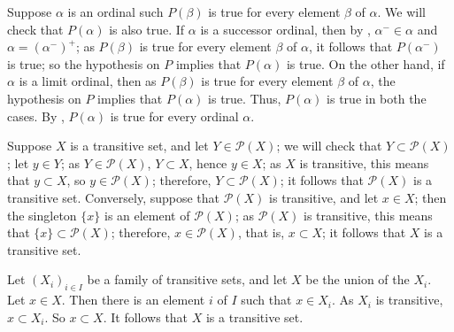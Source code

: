\documentclass{article}
\begin{document}
\begin{solution}[\ref{exe:h8nv276e}]
  \label{sol:ry94ppvi}
  Suppose \(\alpha\) is an ordinal such \(P(\beta)\) is true for every
  element \(\beta\) of \(\alpha\).  We will check that \(P(\alpha)\)
  is also true.  If \(\alpha\) is a successor ordinal, then by
  , \(\alpha^- \in \alpha\) and
  \(\alpha = (\alpha^-)^+\); as \(P(\beta)\) is true for every element
  \(\beta\) of \(\alpha\), it follows that \(P(\alpha^-)\) is true; so
  the hypothesis on \(P\) implies that \(P(\alpha)\) is true.  On the
  other hand, if \(\alpha\) is a limit ordinal, then as \(P(\beta)\)
  is true for every element \(\beta\) of \(\alpha\), the hypothesis on
  \(P\) implies that \(P(\alpha)\) is true.  Thus, \(P(\alpha)\) is
  true in both the cases.  By , \(P(\alpha)\) is
  true for every ordinal \(\alpha\).
\end{solution}

\begin{solution}[\ref{exe:565zdnmj}]
  \label{sol:cs5k5l1y}
  Suppose \(X\) is a transitive set, and let \(Y \in \mathcal{P}(X)\);
  we will check that \(Y \subset \mathcal{P}(X)\); let \(y \in Y\); as
  \(Y \in \mathcal{P}(X)\), \(Y \subset X\), hence \(y \in X\); as
  \(X\) is transitive, this means that \(y \subset X\), so
  \(y \in \mathcal{P}(X)\); therefore, \(Y \subset \mathcal{P}(X)\);
  it follows that \(\mathcal{P}(X)\) is a transitive set.  Conversely,
  suppose that \(\mathcal{P}(X)\) is transitive, and let \(x \in X\);
  then the singleton \(\{ x \}\) is an element of \(\mathcal{P}(X)\);
  as \(\mathcal{P}(X)\) is transitive, this means that
  \(\{ x \} \subset \mathcal{P}(X)\); therefore,
  \(x \in \mathcal{P}(X)\), that is, \(x \subset X\); it follows that
  \(X\) is a transitive set.

  Let \((X_i)_{i \in I}\) be a family of transitive sets, and let
  \(X\) be the union of the \(X_i\).  Let \(x \in X\).  Then there is
  an element \(i\) of \(I\) such that \(x \in X_i\).  As \(X_i\) is
  transitive, \(x \subset X_i\).  So \(x \subset X\).  It follows that
  \(X\) is a transitive set.
\end{solution}
\end{document}

